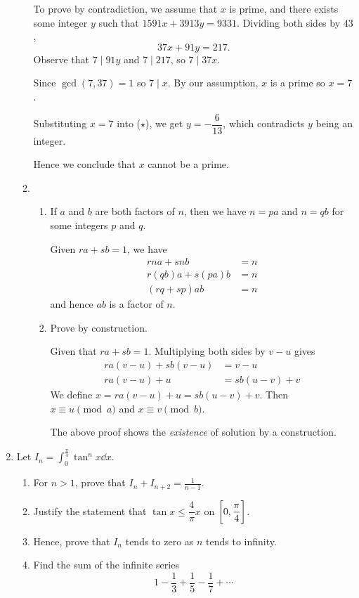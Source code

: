 \begin{enumerate}
\begin{solution}
\begin{enumerate}[label=(\alph*)]
To prove by contradiction, we assume that $x$ is prime, and there exists some integer $y$ such that $1591x+3913y=9331$. Dividing both sides by $43$,
\begin{equation*}\tag{$\star$}
37x+91y=217.
\end{equation*}
Observe that $7\mid91y$ and $7\mid217$, so $7\mid37x$.

Since $\gcd(7,37)=1$ so $7\mid x$. By our assumption, $x$ is a prime so $x=7$.

Substituting $x=7$ into ($\star$), we get $y=-\dfrac{6}{13}$, which contradicts $y$ being an integer.

Hence we conclude that $x$ cannot be a prime.

\item \begin{enumerate}[label=(\roman*)]
    \item If $a$ and $b$ are both factors of $n$, then we have $n=pa$ and $n=qb$ for some integers $p$ and $q$.

    Given $ra+sb=1$, we have
    \begin{align*}
    rna+snb &= n\\
    r(qb)a+s(pa)b &= n \\
    (rq+sp)ab &= n
    \end{align*}
    and hence $ab$ is a factor of $n$.

    \item Prove by construction.

    Given that $ra+sb=1$. Multiplying both sides by $v-u$ gives
    \begin{align*}
    ra(v-u)+sb(v-u)&=v-u\\
    ra(v-u)+u&=sb(u-v)+v
    \end{align*}
    We define $x=ra(v-u)+u=sb(u-v)+v$. Then $x\equiv u\pmod a$ and $x\equiv v\pmod b$.
    \begin{remark}
    The above proof shows the \textit{existence} of solution by a construction.
    \end{remark}
\end{enumerate}
\end{enumerate}
\end{solution}

\item Let $\displaystyle I_n=\int_0^\frac{\pi}{4}\tan^nx\dd{x}$.
\begin{enumerate}[label=(\roman*)]
\item For $n>1$, prove that $\displaystyle I_n+I_{n+2}=\frac{1}{n-1}$.
\item Justify the statement that $\tan x\le\dfrac{4}{\pi}x$ on $\left[0,\dfrac{\pi}{4}\right]$.
\item Hence, prove that $I_n$ tends to zero as $n$ tends to infinity.
\item Find the sum of the infinite series
\[ 1-\frac{1}{3}+\frac{1}{5}-\frac{1}{7}+\cdots \]
\end{enumerate}


\end{enumerate}
